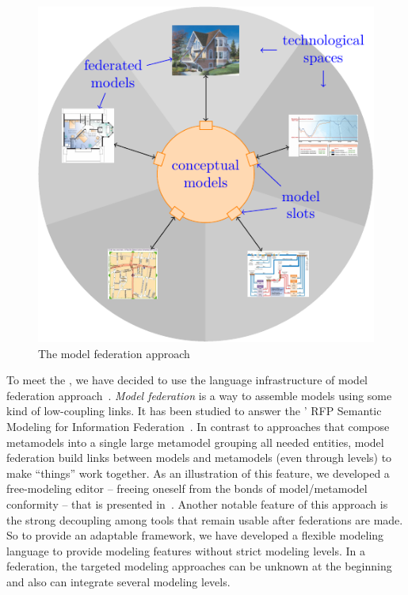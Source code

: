 

\begin{figure}[t]
    \centering
    \includegraphics[width=\columnwidth]{Figures/federation.pdf}
    \caption{The model federation approach}
    \label{fig:mf}
\end{figure}

To meet the \mlpc, we have decided to use the language infrastructure of
model federation approach~\parencite{Golra2016-federation}. \emph{Model
  federation} is a way to assemble models using some kind of
low-coupling links. It has been studied to answer the \OMG' RFP
Semantic Modeling for Information Federation~\parencite{simf}. In
contrast to approaches that compose metamodels into a single large
metamodel grouping all needed entities, model federation build links
between models and metamodels (even through levels) to make ``things''
work together. As an illustration of this feature, we developed a
free-modeling editor -- freeing oneself from the bonds of
model/metamodel conformity -- that is presented
in~\parencite{models2016-freemodel}. Another notable feature of
this approach is the strong decoupling among tools that remain usable
after federations are made.
So to provide an adaptable framework, we have developed a flexible modeling language to provide modeling features without strict modeling levels. In a federation, the targeted modeling approaches can be unknown at the beginning and also can integrate several modeling levels.


